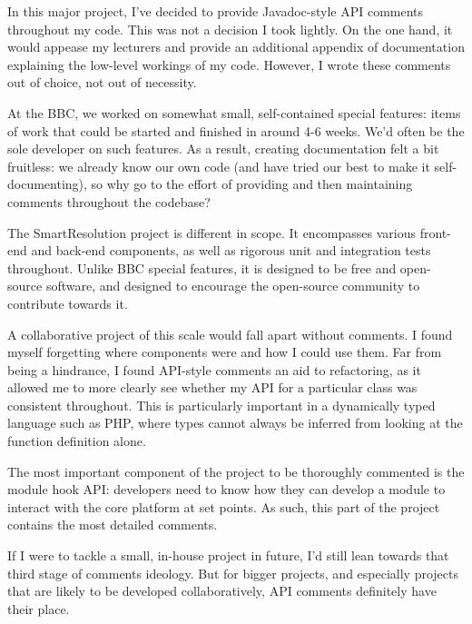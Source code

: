 In this major project, I've decided to provide Javadoc-style API comments throughout my code. This was not a decision I took lightly. On the one hand, it would appease my lecturers and provide an additional appendix of documentation explaining the low-level workings of my code. However, I wrote these comments out of choice, not out of necessity.

At the BBC, we worked on somewhat small, self-contained special features: items of work that could be started and finished in around 4-6 weeks. We'd often be the sole developer on such features. As a result, creating documentation felt a bit fruitless: we already know our own code (and have tried our best to make it self-documenting), so why go to the effort of providing and then maintaining comments throughout the codebase?

The SmartResolution project is different in scope. It encompasses various front-end and back-end components, as well as rigorous unit and integration tests throughout. Unlike BBC special features, it is designed to be free and open-source software, and designed to encourage the open-source community to contribute towards it.

A collaborative project of this scale would fall apart without comments. I found myself forgetting where components were and how I could use them. Far from being a hindrance, I found API-style comments an aid to refactoring, as it allowed me to more clearly see whether my API for a particular class was consistent throughout. This is particularly important in a dynamically typed language such as PHP, where types cannot always be inferred from looking at the function definition alone.

The most important component of the project to be thoroughly commented is the module hook API: developers need to know how they can develop a module to interact with the core platform at set points. As such, this part of the project contains the most detailed comments.

If I were to tackle a small, in-house project in future, I'd still lean towards that third stage of comments ideology. But for bigger projects, and especially projects that are likely to be developed collaboratively, API comments definitely have their place.